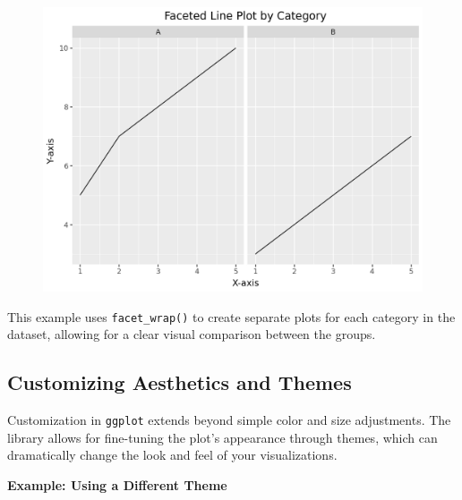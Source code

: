 \documentclass[
  letterpaper,
  DIV=11,
  numbers=noendperiod]{scrreprt}
\begin{document}
\begin{figure}[H]

{\centering \includegraphics{15_Data_Vis_files/figure-pdf/cell-22-output-1.png}

}

\end{figure}

This example uses \texttt{facet\_wrap()} to create separate plots for
each category in the dataset, allowing for a clear visual comparison
between the groups.

\hypertarget{customizing-aesthetics-and-themes}{%
\subsection{Customizing Aesthetics and
Themes}\label{customizing-aesthetics-and-themes}}

Customization in \texttt{ggplot} extends beyond simple color and size
adjustments. The library allows for fine-tuning the plot's appearance
through themes, which can dramatically change the look and feel of your
visualizations.

\textbf{Example: Using a Different Theme}
\end{document}
